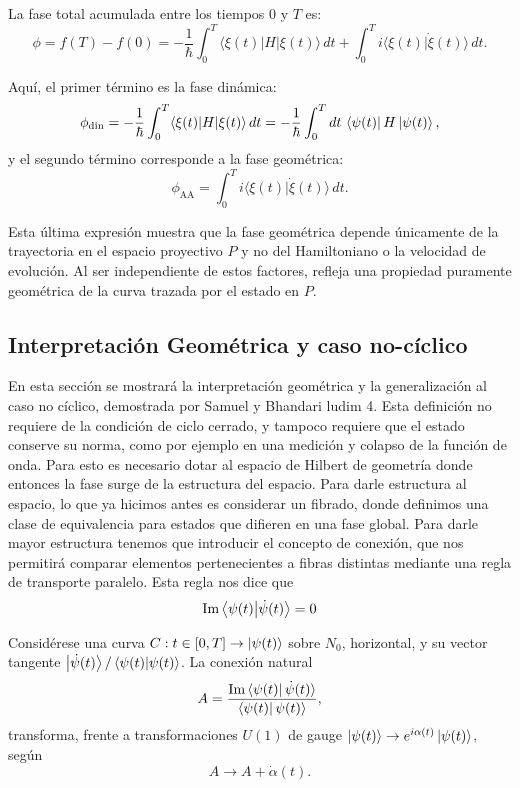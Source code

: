 La fase total acumulada entre los tiempos \( 0 \) y \( T \) es:
\[
\phi = f(T) - f(0) = -\frac{1}{\hbar} \int_0^T \langle \xi(t) | H | \xi(t) \rangle \, dt + \int_0^T i \langle \xi(t) | \dot{\xi}(t) \rangle \, dt.
\]

Aquí, el primer término es la fase dinámica:
\[
\phi_{\text{din}} = -\frac{1}{\hbar} \int_0^T \langle \xi(t) | H | \xi(t) \rangle \, dt = -\frac{1}{\hbar}\int_0^T dt \, \bra{\psi(t)}H\ket{\psi(t)},
\]
y el segundo término corresponde a la fase geométrica:
\begin{equation} \label{eq:fg AA}
    \phi_{\text{AA}} = \int_0^T i \langle \xi(t) | \dot{\xi}(t) \rangle \, dt.
\end{equation}

Esta última expresión muestra que la fase geométrica depende únicamente de la trayectoria en el espacio proyectivo \( P \) y no del Hamiltoniano o la velocidad de evolución. Al ser independiente de estos factores, refleja una propiedad puramente geométrica de la curva trazada por el estado en \( P \).



\subsection{Interpretación Geométrica y caso no-cíclico}
En esta sección se mostrará la interpretación geométrica y la generalización al caso no cíclico, demostrada por Samuel y Bhandari \cite{}ludim 4. Esta definición no requiere de la condición de ciclo cerrado, y tampoco requiere que el estado conserve su norma, como por ejemplo en una medición y colapso de la función de onda. Para esto es necesario dotar al espacio de Hilbert de geometría donde entonces la fase surge de la estructura del espacio. \newline
Para darle estructura al espacio, lo que ya hicimos antes es considerar un fibrado, donde definimos una clase de equivalencia para estados que difieren en una fase global. Para darle mayor estructura tenemos que introducir el concepto de conexión, que nos permitirá comparar elementos pertenecientes a fibras distintas mediante una regla de transporte paralelo. Esta regla nos dice que
\begin{equation} \label{eq2:transporte paralelo}
    \text{Im} \braket{\psi(t)}{\dot \psi(t)}=0
\end{equation}

Considérese una curva \( C: t \in [0, T] \to \ket{\psi(t)} \) sobre \( N_0 \), horizontal, y su vector tangente $\ket{\dot{\psi}(t)}/\braket{\psi(t)}{\psi(t)}$. La conexión natural
\begin{equation}
A = \frac{\text{Im} \bra{\psi(t)} \dot{\psi}(t) \rangle}{\bra{\psi(t)} \psi(t) \rangle},
\end{equation}
transforma, frente a transformaciones \( U(1) \) de gauge \( \ket{\psi(t)} \to e^{i\alpha(t)} \ket{\psi(t)} \), según
\begin{equation} \label{eq2:transformación de gauge}
A \to A + \dot{\alpha}(t).
\end{equation}

